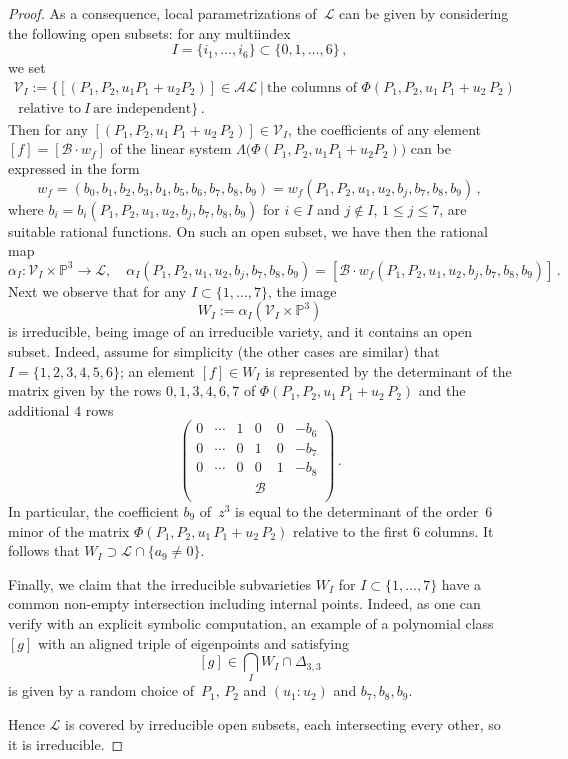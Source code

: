 \documentclass[a4paper, 11pt, reqno]{amsart}
\theoremstyle{plain}
\theoremstyle{definition}
\newcommand{\p}{\mathbb{P}}
\newcommand{\sL}{\mathcal{L}}
\newcommand{\sV}{\mathcal{V}}
\begin{document}
\begin{proof}
As a consequence, local parametrizations of~$\sL$ can be given by considering the following open subsets:
for any multiindex
%
\[
  I = \{i_1, \dots, i_6\} \subset \{0, 1, \dots, 6\} \,,
\]
%
we set
%
\begin{multline*}
  \sV_I :=
  \bigl\{
    [(P_1, P_2, u_1 P_1 +u_2P_2)] \in \mathcal{AL} \ | \ \text{the\ columns\ of\ } \Phi
    (P_1, P_2, u_1 \, P_1 + u_2 \, P_2) \\
    \text{\ relative \ to} \ I\ \text{are\ independent}
  \bigr\} \,.
\end{multline*}
%
Then for any $[(P_1, P_2, u_1 \, P_1 + u_2 \, P_2)] \in \sV_I$, the coefficients of any element
$[f] =[\mathcal{B} \cdot w_f]$ of the linear system
$\Lambda \bigl( \Phi (P_1, P_2, u_1 P_1 + u_2P_2) \bigr)$ can be expressed in the form
%
\begin{equation}
\label{eq: parametrizzazione}
  w_f = (b_0,
  b_1,
  b_2,
  b_3,
  b_4,
  b_5, b_6,b_7,b_8,b_9) = w_f(P_1,P_2,u_1,u_2,b_j,b_7,b_8,b_9) \,,
\end{equation}
%
where $b_i = b_i(P_1,P_2,u_1,u_2,b_j,b_7,b_8,b_9)$ for $i\in I$ and $j \not \in I$, $1\le j \le 7$, are suitable rational functions.
On such an open subset, we have then the rational map
%
\[
  \alpha_I \colon \sV_I \times \p^3 \to \sL, \quad
  \alpha_I (P_1,P_2,u_1,u_2,b_j,b_7,b_8,b_9)=
  [\mathcal{B} \cdot w_f(P_1,P_2,u_1,u_2,b_j,b_7,b_8,b_9)] \,.
\]
%
Next we observe that for any $I \subset \{1,\dots, 7\}$, the image
%
\[
  W_I := \alpha_I (\sV_I \times \p^3)
\]
%
is irreducible, being image of an irreducible variety, and it
contains an open subset. Indeed, assume for simplicity (the other cases are similar) that
$I=\{1,2,3,4,5,6\}$; an element $[f]\in W_I$ is represented by the determinant of the
matrix given by the rows $0,1,3,4,6,7$ of $\Phi (P_1, P_2, u_1 \, P_1 + u_2 \, P_2)$ and the additional $4$ rows
%
\[
  \left(
  \begin{array}{cccccc}
    0 & \cdots & 1&0&0&-b_6 \\
    0 & \cdots & 0&1&0&-b_7 \\
    0 & \cdots & 0&0&1&-b_8 \\
    & & & \mathcal{B} & & \\
  \end{array}
  \right) \,.
\]
%
In particular, the coefficient $b_9$ of~$z^3$ is equal to the determinant of the order~$6$ minor of the matrix $\Phi (P_1, P_2, u_1 \, P_1 + u_2 \, P_2)$ relative to the first $6$ columns. It follows that $W_I \supset \sL \cap \{ a_9 \neq 0\}$. 

Finally, we claim that the irreducible subvarieties $W_I$ for $I\subset \{1,\dots, 7\}$ have a common non-empty intersection
including internal points. Indeed, as one can verify with an explicit symbolic computation, an example of a polynomial
class~$[g]$ with an aligned triple of eigenpoints and satisfying
%
\[
  [g] \in \bigcap_I W_I \cap \Delta_{3,3}
\]
%
is given by a random choice of~$P_1$, $P_2$ and $(u_1:u_2)$ and $b_7,b_8,b_9$.

Hence $\sL$ is covered by irreducible open subsets, each intersecting every other, so it is irreducible.
\end{proof}
\end{document}
